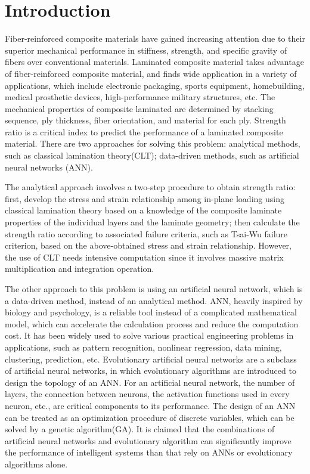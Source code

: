 \section{Introduction}

Fiber-reinforced composite materials have gained increasing attention due to
their superior mechanical performance in stiffness, strength, and specific
gravity of fibers over conventional materials. Laminated composite material
takes advantage of fiber-reinforced composite material, and finds wide
application in a variety of applications, which include electronic packaging,
sports equipment, homebuilding, medical prosthetic devices, high-performance
military structures, etc. The mechanical properties of composite laminated are
determined by stacking sequence, ply thickness, fiber orientation, and material
for each ply. Strength ratio\cite{todoroki1998stacking,liu2000permutation,sivakumar1998optimum,walker2003technique,lin2004stacking,kang2005minimum,murugan2007target,akbulut2008optimum} is a critical
index to predict the performance of a laminated composite material. There are
two approaches for solving this problem: analytical methods, such as classical
lamination theory(CLT); data-driven methods, such as artificial neural networks
(ANN).

The analytical approach involves a two-step procedure to obtain strength ratio:
first, develop the stress and strain relationship among in-plane loading using
classical lamination theory based on a knowledge of the composite laminate
properties of the individual layers and the laminate geometry; then calculate
the strength ratio according to associated failure criteria, such as Tsai-Wu
failure criterion, based on the above-obtained stress and strain relationship.
However, the use of CLT needs intensive computation since it involves massive
matrix multiplication and integration operation.

The other approach to this problem is using an artificial neural network, which
is a data-driven method, instead of an analytical method. ANN, heavily inspired
by biology and psychology, is a reliable tool instead of a complicated
mathematical model, which can accelerate the calculation process and reduce the
computation cost. It has been widely used to solve various practical engineering
problems in applications\cite{YAN2020108014,MENTGES2021108736}, such as pattern recognition, nonlinear
regression, data mining, clustering, prediction, etc. Evolutionary artificial
neural networks are a subclass of artificial neural networks, in which
evolutionary algorithms are introduced to design the topology of an ANN. For an
artificial neural network, the number of layers, the connection between neurons,
the activation functions used in every neuron, etc., are critical components to
its performance. The design of an ANN can be treated as an optimization
procedure of discrete variables, which can be solved by a genetic algorithm(GA).
It is claimed that the combinations of artificial neural networks and
evolutionary algorithm\cite{lobo2007parameter} can significantly improve the performance of
intelligent systems than that rely on ANNs or evolutionary algorithms alone.

